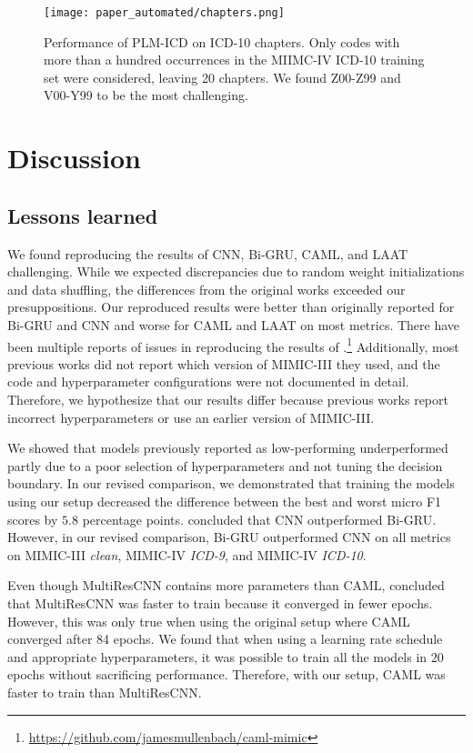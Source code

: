 {\begin{figure}[t]
    \centering
    \texttt{[image: paper\_automated/chapters.png]}
    \caption[Performance of PLM-ICD on ICD-10 chapters]{Performance of PLM-ICD on ICD-10 chapters. Only codes with more than a hundred occurrences in the MIIMC-IV ICD-10 training set were considered, leaving 20 chapters. We found Z00-Z99 and V00-Y99 to be the most challenging.}
    \label{fig:chapter_performance}
\end{figure}




\section{Discussion}
\subsection{Lessons learned}
We found reproducing the results of CNN, Bi-GRU, CAML, and LAAT challenging. While we expected discrepancies due to random weight initializations and data shuffling, the differences from the original works exceeded our presuppositions. Our reproduced results were better than originally reported for Bi-GRU and CNN and worse for CAML and LAAT on most metrics. There have been multiple reports of issues in reproducing the results of \textcite{mullenbachExplainablePredictionMedical2018}.\footnote{\url{https://github.com/jamesmullenbach/caml-mimic}} Additionally, most previous works did not report which version of MIMIC-III they used, and the code and hyperparameter configurations were not documented in detail. Therefore, we hypothesize that our results differ because previous works report incorrect hyperparameters or use an earlier version of MIMIC-III.

We showed that models previously reported as low-performing underperformed partly due to a poor selection of hyperparameters and not tuning the decision boundary. In our revised comparison, we demonstrated that training the models using our setup decreased the difference between the best and worst micro F1 scores by $5.8$ percentage points. \textcite{mullenbachExplainablePredictionMedical2018} concluded that CNN outperformed Bi-GRU. However, in our revised comparison, Bi-GRU outperformed CNN on all metrics on MIMIC-III \textit{clean}, MIMIC-IV \textit{ICD-9}, and MIMIC-IV \textit{ICD-10}.

Even though MultiResCNN contains more parameters than CAML, \textcite{liICDCodingClinical2020} concluded that MultiResCNN was faster to train because it converged in fewer epochs. However, this was only true when using the original setup where CAML converged after 84 epochs. We found that when using a learning rate schedule and appropriate hyperparameters, it was possible to train all the models in 20 epochs without sacrificing performance. Therefore, with our setup, CAML was faster to train than MultiResCNN.

}
